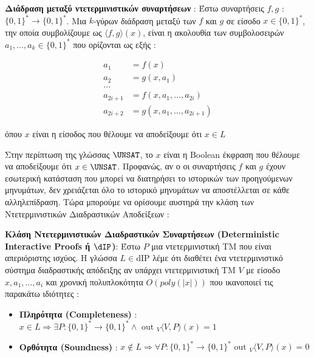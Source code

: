 \begin{definition}
\textbf{Διάδραση μεταξύ ντετερμινιστικών συναρτήσεων} : Έστω συναρτήσεις $f, g$ : $\{0,1\}^{*} \rightarrow\{0,1\}^{*}$. Μια $k$-γύρων διάδραση μεταξύ των $f$ και $g$ σε είσοδο $x \in\{0,1\}^{*}$, την οποία συμβολίζουμε ως $\langle f, g\rangle(x)$, είναι η ακολουθία των συμβολοσειρών $a_{1}, \ldots, a_{k} \in\{0,1\}^{*}$ που ορίζονται ως εξής :

\[
\begin{aligned}
a_{1} &=f(x) \\
a_{2} &=g(x, a_{1}) \\
\ldots & \\
a_{2 i+1} &=f(x, a_{1}, \ldots, a_{2 i}) \\
a_{2 i+2} &=g(x, a_{1}, \ldots, a_{2 i+1})
\end{aligned}
\]

όπου $x$ είναι η είσοδος που θέλουμε να αποδείξουμε ότι $x \in L$
\end{definition}

Στην περίπτωση της γλώσσας $\UNSAT$, το $x$ είναι η Boolean έκφραση που θέλουμε να αποδείξουμε ότι $x \in \UNSAT$. Προφανώς, αν ο οι συναρτήσεις $f$ και $g$ έχουν εσωτερική κατάσταση που μπορεί να διατηρήσει το ιστορικών των προηγούμενων μηνυμάτων, δεν χρειάζεται όλο το ιστορικό μηνυμάτων να αποστέλλεται σε κάθε αλληλεπίδραση. Τώρα μπορούμε να ορίσουμε αυστηρά την κλάση των Ντετερμινιστικών Διαδραστικών Αποδείξεων :

\begin{definition}
\textbf{Κλάση Ντετερμινιστικών Διαδραστικών Συναρτήσεων (Deterministic Interactive Proofs ή $\dIP$)}: Έστω $P$ μια ντετερμινιστική ΤΜ που είναι απεριόριστης ισχύος. Η γλώσσα $L \in \text{dIP}$ λέμε ότι διαθέτει ένα ντετερμινιστικό σύστημα διαδραστικής απόδειξης αν υπάρχει ντετερμινιστική TM $V$ με είσοδο $x, a_{1}, \ldots, a_{i}$ και χρονική πολυπλοκότητα $O(poly(|x|))$ που ικανοποιεί τις παρακάτω ιδιότητες :
\begin{itemize}
    \item \textbf{Πληρότητα (Completeness)} : $x \in L \Rightarrow \exists P:\{0,1\}^{*} \rightarrow\{0,1\}^{*} \wedge \text { out }_{V}\langle V, P\rangle(x) = 1$
    \item \textbf{Ορθότητα (Soundness)} : $x \notin L \Rightarrow \forall P:\{0,1\}^{*} \rightarrow\{0,1\}^{*} \text { out }_{V}\langle V, P\rangle(x) = 0$
\end{itemize}
\end{definition}

